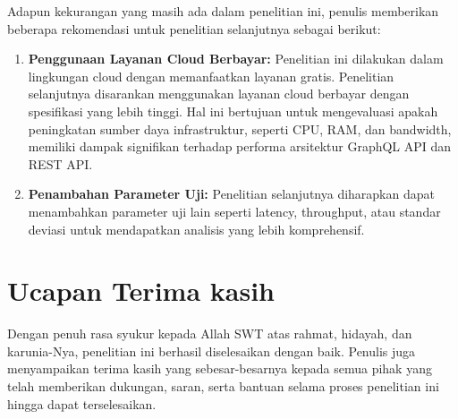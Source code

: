 \documentclass[
 manuscript=article,  %
  layout=publish, 
  year=2024, 
  month= Februari, %
  volume=8,
  number=1 
]{JIKO}
\begin{document}
Adapun kekurangan yang masih ada dalam penelitian ini, penulis memberikan beberapa rekomendasi untuk penelitian selanjutnya sebagai berikut:

\begin{enumerate}[left=0.5in]
    \item \textbf{Penggunaan Layanan Cloud Berbayar:} Penelitian ini dilakukan dalam lingkungan cloud dengan memanfaatkan layanan gratis. Penelitian selanjutnya disarankan menggunakan layanan cloud berbayar dengan spesifikasi yang lebih tinggi. Hal ini bertujuan untuk mengevaluasi apakah peningkatan sumber daya infrastruktur, seperti CPU, RAM, dan bandwidth, memiliki dampak signifikan terhadap performa arsitektur GraphQL API dan REST API.
    \item \textbf{Penambahan Parameter Uji:} Penelitian selanjutnya diharapkan dapat menambahkan parameter uji lain seperti latency, throughput, atau standar deviasi untuk mendapatkan analisis yang lebih komprehensif.
\end{enumerate}

\section*{Ucapan Terima kasih}
Dengan penuh rasa syukur kepada Allah SWT atas rahmat, hidayah, dan karunia-Nya, penelitian ini berhasil diselesaikan dengan baik. Penulis juga menyampaikan terima kasih yang sebesar-besarnya kepada semua pihak yang telah memberikan dukungan, saran, serta bantuan selama proses penelitian ini hingga dapat terselesaikan.

\renewcommand{\refname}{Pustaka} %
	

\end{document}

